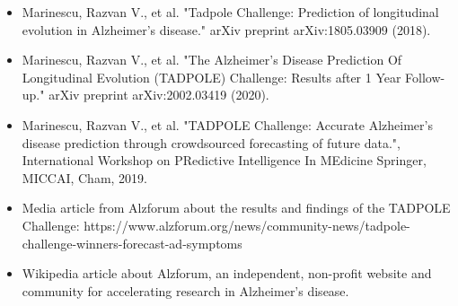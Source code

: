 \documentclass[11pt]{article}
\begin{document}
 \vspace{-7em}
\begin{itemize}
 \item Marinescu, Razvan V., et al. "Tadpole Challenge: Prediction of longitudinal evolution in Alzheimer's disease." arXiv preprint arXiv:1805.03909 (2018).
 \item Marinescu, Razvan V., et al. "The Alzheimer's Disease Prediction Of Longitudinal Evolution (TADPOLE) Challenge: Results after 1 Year Follow-up." arXiv preprint arXiv:2002.03419 (2020).
 \item Marinescu, Razvan V., et al. "TADPOLE Challenge: Accurate Alzheimer’s disease prediction through crowdsourced forecasting of future data.", International Workshop on PRedictive Intelligence In MEdicine Springer, MICCAI, Cham, 2019.
 \item Media article from Alzforum about the results and findings of the TADPOLE Challenge: https://www.alzforum.org/news/community-news/tadpole-challenge-winners-forecast-ad-symptoms
 \item Wikipedia article about Alzforum, an independent, non-profit website and community for accelerating research in Alzheimer's disease.
\end{itemize}
 
 
 
 
 
 
\end{document}
